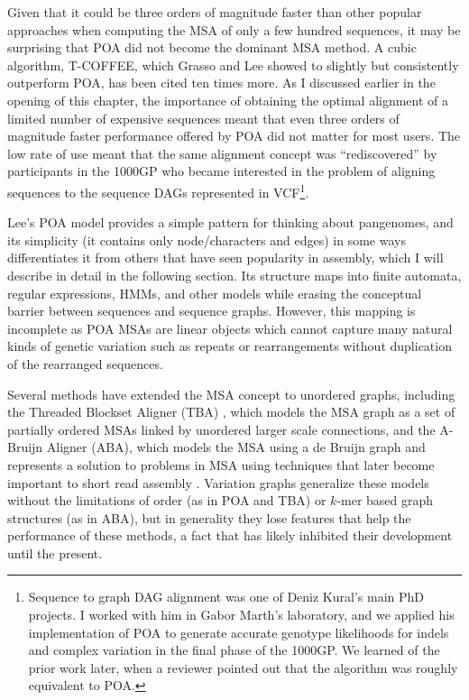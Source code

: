 Given that it could be three orders of magnitude faster than other popular approaches when computing the MSA of only a few hundred sequences, it may be surprising that POA did not become the dominant MSA method.
A cubic algorithm, T-COFFEE, which Grasso and Lee showed to slightly but consistently outperform POA, has been cited ten times more.
As I discussed earlier in the opening of this chapter, the importance of obtaining the optimal alignment of a limited number of expensive sequences meant that even three orders of magnitude faster performance offered by POA did not matter for most users.
The low rate of use meant that the same alignment concept was ``rediscovered'' by participants in the 1000GP who became interested in the problem of aligning sequences to the sequence DAGs represented in VCF\footnote{Sequence to graph DAG alignment was one of Deniz Kural's main PhD projects. I worked with him in Gabor Marth's laboratory, and we applied his implementation of POA to generate accurate genotype likelihoods for indels and complex variation in the final phase of the 1000GP. We learned of the prior work later, when a reviewer pointed out that the algorithm was roughly equivalent to POA.}.

Lee's POA model provides a simple pattern for thinking about pangenomes, and its simplicity (it contains only node/characters and edges) in some ways differentiates it from others that have seen popularity in assembly, which I will describe in detail in the following section.
Its structure maps into finite automata, regular expressions, HMMs, and other models while erasing the conceptual barrier between sequences and sequence graphs.
However, this mapping is incomplete as POA MSAs are linear objects which cannot capture many natural kinds of genetic variation such as repeats or rearrangements without duplication of the rearranged sequences.

Several methods have extended the MSA concept to unordered graphs, including the Threaded Blockset Aligner (TBA) \cite{blanchette2004aligning}, which models the MSA graph as a set of partially ordered MSAs linked by unordered larger scale connections, and the A-Bruijn Aligner (ABA), which models the MSA using a de Bruijn graph and represents a solution to problems in MSA using techniques that later become important to short read assembly \cite{raphael2004novel}.
Variation graphs generalize these models without the limitations of order (as in POA and TBA) or $k$-mer based graph structures (as in ABA), but in generality they lose features that help the performance of these methods, a fact that has likely inhibited their development until the present.

